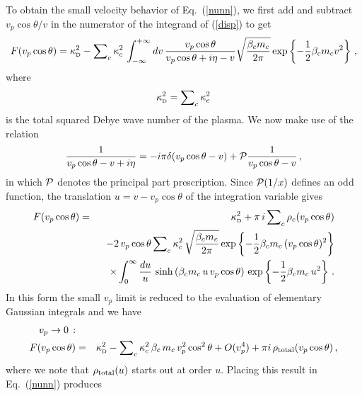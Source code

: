 \documentclass[preprint,12pt,eqsecnum,nofootinbib,amsmath,amssymb]{revtex4}
\newcommand{\smD}{{\rm\scriptscriptstyle D}}
\begin{document}
To obtain the small velocity behavior of 
Eq.~(\ref{nunn}), we first add and
subtract $v_p\cos\theta/v$ in the numerator of 
the integrand of (\ref{disp}) to get
\begin{equation}
  F(v_p  \cos\theta)  = \kappa^2_\smD  - 
  {\sum}_c \, \kappa^2_c \, 
  \int_{-\infty}^{+\infty} dv \, { v_p 
  \cos\theta  \over v_p \cos\theta + i 
  \eta - v}\sqrt{ \beta_c m_c \over 2\pi } 
  \exp\left\{ - { 1 \over 2} \beta_c m_c v^2
  \right\} \,,
\label{structt}
\end{equation}
where
\begin{equation}
  \kappa^2_\smD = {\sum}_c \, \kappa_c^2
\end{equation}
is the total squared Debye wave number of 
the plasma. We now make use of the relation
\begin{equation}
  {1 \over v_p \cos\theta -v + i \eta} =
  - i \pi \delta(v_p \cos\theta - v ) +
  {\cal P} { 1 \over v_p \cos\theta - v } \,,
\end{equation}
in which ${\cal P}$ denotes the principal part
prescription. Since ${\cal P} (1/x)$ defines 
an odd function, the translation $ u = v - 
v_p \cos\theta$ of the integration variable
gives
\begin{eqnarray}
  F(v_p  \cos\theta)  &=& \kappa^2_\smD  + 
  \pi \, i \, {\sum}_c \, \rho_c(v_p \cos\theta) 
\nonumber\\
  &&
  - 2 \, v_p \cos\theta \, {\sum}_c \, 
  \kappa^2_c\, \sqrt{ \beta_c m_c \over 2\pi } 
  \exp\left\{ - {1 \over 2} \beta_c m_c \, (v_p 
  \cos\theta)^2\right\}
\nonumber\\
  && \quad \times
  \int_0^{\infty}  { du \over u} \, \sinh 
  \left( \beta_c m_c \, u \, v_p \cos\theta 
  \right) \, \exp\left\{-{1 \over 2} \beta_c 
  m_c \, u^2 \right\} \,.
\label{structtt}
\end{eqnarray}
In this form the small $v_p$ limit is reduced 
to the evaluation of elementary Gaussian integrals 
and we have
\begin{eqnarray}
  v_p \to 0 \,: &&
\nonumber\\
  F(v_p  \cos\theta)  &=& \kappa^2_\smD -
  {\sum}_c \, \kappa^2_c \, \beta_c \, m_c \,
   v_p^2 \cos^2\theta + O(v_p^4)  
+ \pi i \, \rho_{\rm total}(v_p\cos\theta) \,,
\nonumber\\
\label{smstruct}
\end{eqnarray}
where we note that $\rho_{\rm total}(u)$ starts 
out at order $u$. 
Placing this result in Eq.~(\ref{nunn})  produces
\end{document}
